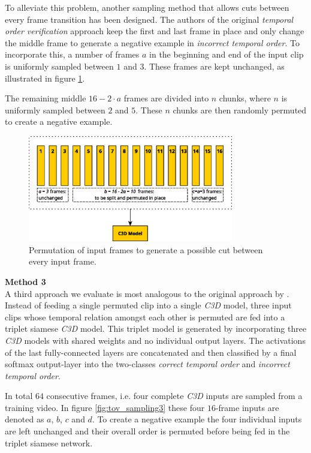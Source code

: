 To alleviate this problem, another sampling method that allows cuts between every frame transition has been designed.
The authors of the original \textit{temporal order verification} approach \cite{misra_shuffle_2016} keep the first and last frame in place and only change the middle frame to generate a negative example in \textit{incorrect temporal order}.
To incorporate this, a number of frames $a$ in the beginning and end of the input clip is uniformly sampled between $1$ and $3$.
These frames are kept unchanged, as illustrated in figure \ref{fig:tov_sampling2}.

The remaining middle $16 - 2 \cdot a$ frames are divided into $n$ chunks, where $n$ is uniformly sampled between $2$ and $5$.
These $n$ chunks are then randomly permuted to create a negative example.

\begin{figure}[H]
    \centering
    \includegraphics[width=0.8\textwidth]{img_approach/tov_sampling2}
    \caption{Permutation of input frames to generate a possible cut between every input frame.}
    \label{fig:tov_sampling2}
\end{figure}


\textbf{Method 3}\\
A third approach we evaluate is most analogous to the original approach by \textcite{misra_shuffle_2016}.
Instead of feeding a single permuted clip into a single \textit{C3D} model, three input clips whose temporal relation amongst each other is permuted are fed into a triplet siamese \textit{C3D} model.
This triplet model is generated by incorporating three \textit{C3D} models with shared weights and no individual output layers.
The activations of the last fully-connected layers are concatenated and then classified by a final softmax output-layer into the two-classes \textit{correct temporal order} and \textit{incorrect temporal order}.

In total $64$ consecutive frames, i.e. four complete \textit{C3D} inputs are sampled from a training video.
In figure \ref{fig:tov_sampling3} these four $16$-frame inputs are denoted as $a$, $b$, $c$ and $d$.
To create a negative example the four individual inputs are left unchanged and their overall order is permuted before being fed in the triplet siamese network.

